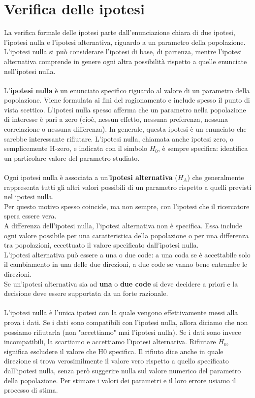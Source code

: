 \documentclass[10pt, draft]{book}
\begin{document}
\section{Verifica delle ipotesi}
La verifica formale delle ipotesi parte dall'enunciazione chiara di due ipotesi, l'ipotesi nulla e l'ipotesi alternativa, riguardo a un parametro della popolazione. L'ipotesi nulla si può considerare l'ipotesi di base, di partenza, mentre l'ipotesi alternativa comprende in genere ogni altra possibilità rispetto a quelle enunciate nell'ipotesi nulla. 
\\
\\
L'\textbf{ipotesi nulla} è un enunciato specifico riguardo al valore di un parametro della popolazione. Viene formulata ai fini del ragionamento e include spesso il punto di vista scettico. L'ipotesi nulla spesso afferma che un parametro nella popolazione di interesse è pari a zero (cioè, nessun effetto, nessuna preferenza, nessuna correlazione o nessuna differenza). In generale, questa ipotesi è un enunciato che sarebbe interessante rifiutare. L'ipotesi nulla, chiamata anche ipotesi zero, o semplicemente H-zero, e indicata con il simbolo $H_0$, è sempre specifica: identifica un particolare valore del parametro studiato. 
\\
\\
Ogni ipotesi nulla è associata a un'\textbf{ipotesi alternativa} ($H_A$) che generalmente rappresenta tutti gli altri valori possibili di un parametro rispetto a quelli previsti nel ipotesi nulla.
\\
Per questo motivo spesso coincide, ma non sempre, con l'ipotesi che il ricercatore spera essere vera.
\\
A differenza dell'ipotesi nulla, l'ipotesi alternativa non è specifica. Essa include ogni valore possibile per una caratteristica della popolazione o per una differenza tra popolazioni, eccettuato il valore specificato dall'ipotesi nulla.
\\
L'ipotesi alternativa può essere a una o due code: a una coda se è accettabile solo il cambiamento in una delle due direzioni, a due code se vanno bene entrambe le direzioni.
\\
Se un'ipotesi alternativa sia ad \textbf{una} o \textbf{due code} si deve decidere a priori e la decisione deve essere supportata da un forte razionale.
\\
\\
L'ipotesi nulla è l'unica ipotesi con la quale vengono effettivamente messi alla prova i dati. Se i dati sono compatibili con l'ipotesi nulla, allora diciamo che non possiamo rifiutarla (non "accettiamo" mai l'ipotesi nulla). Se i dati sono invece incompatibili, la scartiamo e accettiamo l'ipotesi alternativa. Rifiutare $H_0$, significa escludere il valore che H0 specifica. Il rifiuto dice anche in quale direzione si trova verosimilmente il valore vero rispetto a quello specificato dall'ipotesi nulla, senza però suggerire nulla sul valore numerico del parametro della popolazione. Per stimare i valori dei parametri e il loro errore usiamo il processo di stima.
\end{document}

